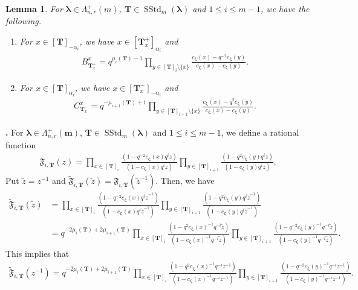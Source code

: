 \documentclass[12pt]{amsart}
\newtheorem{lem}[thm]{Lemma}
\def \para{\refstepcounter{thm} \par\medskip\noindent
                \textbf{\thethm .} }
\numberwithin{equation}{thm}
\newcommand\bT{\mathbf T}
\renewcommand\bm{\mathbf m} %
\newcommand\fF{\mathfrak F}
\renewcommand\a{\alpha}  %
\newcommand\vL{\varLambda}
\newcommand\Bz{\boldsymbol\zeta}
\newcommand\Bla{\boldsymbol\lambda}
\newcommand\ti{\tilde}
\newcommand{\SStd}{\operatorname{SStd}}
\begin{document}
\begin{lem} 
\label{Lemma BbT x+ x} 
For $\Bla \in \vL_{n,r}^+(m)$, $\bT \in \SStd_m(\Bla)$ and $1 \leq i \leq m-1$, 
we have the following. 
\begin{enumerate} 
\item 
For $x \in [\bT]_{-\a_i}$, we have $ x \in [\bT_x^+]_{\a_i}$ and 
\begin{align*}
B_{\bT_x^+}^x = q^{\mu_i(\bT) -1} 
	\prod_{y \in [\bT]_i \setminus \{x\}} \frac{ c_{\Bz} (x) - q^{-2} c_{\Bz} (y)}{c_{\Bz} (x) - c_{\Bz} (y)}. 
\end{align*}

\item 
For $x \in [\bT]_{\a_i}$, we have $x \in [\bT_x^-]_{-\a_i}$ and  
\begin{align*}
C_{\bT_x^-}^x = q^{-\mu_{i+1} (\bT) +1} 
	\prod_{ y \in [\bT]_{i+1} \setminus \{x\}} \frac{ c_{\Bz} (x) - q^2 c_{\Bz} (y)}{ c_{\Bz} (x) - c_{\Bz} (y)}.  
\end{align*}
\end{enumerate}
\end{lem}

\para 
For $\Bla \in \vL_{n,r}^+(\bm)$, $\bT \in \SStd_m(\Bla)$ and $1 \leq i \leq m-1$, 
we define a rational function 
\begin{align}
\label{Def fFibT z} 
\fF_{i,\bT}(z) = \prod_{ x \in [\bT]_i} \frac{ (1 - q^{-2} c_{\Bz} (x) q^i z)}{ (1 - c_{\Bz} (x) q^i z)} 
				\prod_{y \in [\bT]_{i+1}} \frac{(1 - q^2 c_{\Bz} (y) q^i z)}{( 1 - c_{\Bz} (y) q^i z )}. 
\end{align}
Put $\ti{z} = z^{-1}$ and $\ti{\fF}_{i, \bT}(\ti{z}) = \fF_{i,\bT} (\ti{z}^{-1})$. 
Then, we have 
\begin{align*}
\ti{\fF}_{i,\bT} (\ti{z}) 
&= \prod_{ x \in [\bT]_i} \frac{ (1 - q^{-2} c_{\Bz} (x) q^i \ti{z}^{-1})}{ (1 - c_{\Bz} (x) q^i \ti{z}^{-1})} 
				\prod_{y \in [\bT]_{i+1}} \frac{(1 - q^2 c_{\Bz} (y) q^i \ti{z}^{-1})}{( 1 - c_{\Bz} (y) q^i \ti{z}^{-1} )}
\\
&=q^{-2 \mu_i(\bT) + 2 \mu_{i+1} (\bT)} 
	\prod_{ x \in [\bT]_i} \frac{ (1 - q^{2} c_{\Bz} (x)^{-1} q^{-i} \ti{z})}{ (1 - c_{\Bz} (x)^{-1} q^{- i} \ti{z})} 
				\prod_{y \in [\bT]_{i+1}} \frac{(1 - q^{-2} c_{\Bz} (y)^{-1} q^{ - i} \ti{z})}{( 1 - c_{\Bz} (y)^{-1} q^{-i} \ti{z} )}. 
\end{align*}
This implies that 
\begin{align}
\label{tifF i bT z-1}
\ti{\fF}_{i,\bT} (z^{-1}) 
= q^{-2 \mu_i(\bT) + 2 \mu_{i+1} (\bT)} 
	\prod_{ x \in [\bT]_i} \frac{ (1 - q^{2} c_{\Bz} (x)^{-1} q^{-i} z^{-1} )}{ (1 - c_{\Bz} (x)^{-1} q^{- i} z^{-1} )} 
				\prod_{y \in [\bT]_{i+1}} \frac{(1 - q^{-2} c_{\Bz} (y)^{-1} q^{ - i} z^{-1} )}{( 1 - c_{\Bz} (y)^{-1} q^{-i} z^{-1} )}. 
\end{align}
\end{document}
